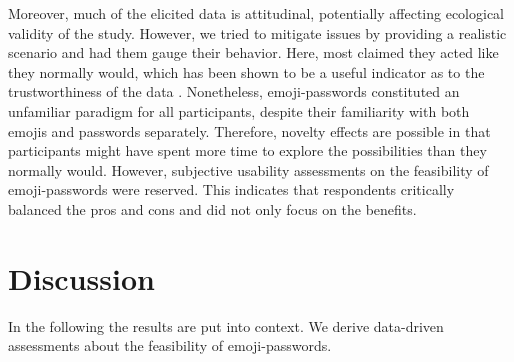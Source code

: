 Moreover, much of the elicited data is attitudinal, potentially affecting ecological validity of the study. However, we tried to mitigate issues by providing a realistic scenario and had them gauge their behavior. Here, most claimed they acted like they normally would, which has been shown to be a useful indicator as to the trustworthiness of the data \cite{Fahl2013EcologicalValidityPasswordStudy}. Nonetheless, emoji-passwords constituted an unfamiliar paradigm for all participants, despite their familiarity with both emojis and passwords separately. Therefore, novelty effects are possible in that participants might have spent more time to explore the possibilities than they normally would. However, subjective usability assessments on the feasibility of emoji-passwords were reserved. This indicates that respondents critically balanced the pros and cons and did not only focus on the benefits.


\section{Discussion}
In the following the results are put into context. We derive data-driven assessments about the feasibility of emoji-passwords. 
